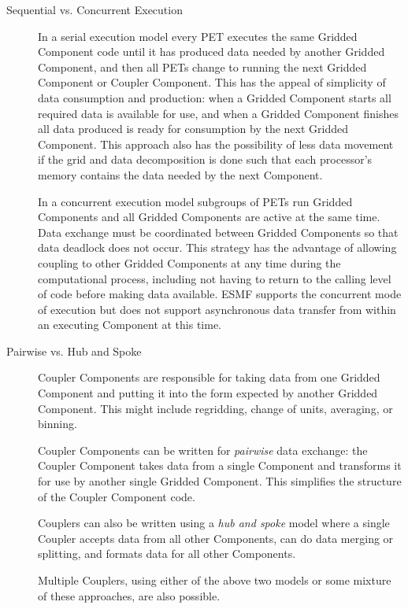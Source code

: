 \begin{description}

\item[Sequential vs. Concurrent Execution]

In a serial execution model every PET executes the same Gridded 
Component code until it has produced data needed by another 
Gridded Component, and then all PETs change to running the next 
Gridded Component or Coupler Component.  This has the appeal of 
simplicity of data consumption and production: when a Gridded 
Component starts all required data is available for use, and when 
a Gridded Component finishes all data produced is ready for consumption 
by the next Gridded Component.  This approach also has
the possibility of less data movement if the grid and
data decomposition is done such that each processor's memory contains
the data needed by the next Component.

In a concurrent execution model subgroups of PETs run
Gridded Components and all Gridded Components are active at the 
same time.  Data exchange must be coordinated between Gridded 
Components so that data deadlock does not occur.  This strategy 
has the advantage of allowing coupling to other Gridded Components 
at any time during the computational process, including not 
having to return to the calling level of code before making 
data available.  ESMF supports the concurrent mode of execution
but does not support asynchronous data transfer from within an 
executing Component at this time.

\item[Pairwise vs. Hub and Spoke]

Coupler Components are responsible for taking data from one
Gridded Component and putting it into the form expected by another 
Gridded Component.  This might include regridding, change of units, 
averaging, or binning.

Coupler Components can be written for {\it pairwise} data exchange: 
the Coupler Component takes data from a single Component and transforms 
it for use by another single Gridded Component.  This simplifies the 
structure of the Coupler Component code.

Couplers can also be written using a {\it hub and spoke} model where a
single Coupler accepts data from all other Components, can do data
merging or splitting, and formats data for all other Components.

Multiple Couplers, using either of the above two models or some mixture of
these approaches, are also possible.


\end{description}
